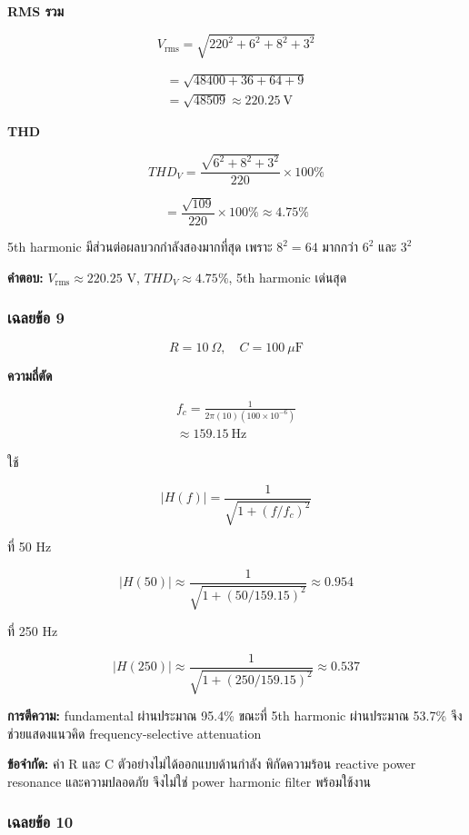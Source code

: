 \textbf{RMS รวม}

\[
V_{\mathrm{rms}}=\sqrt{220^2+6^2+8^2+3^2}
\]

\[
\begin{aligned}
    =\sqrt{48400+36+64+9} \\
    =\sqrt{48509}\approx220.25\ \text{V}
\end{aligned}
\]

\textbf{THD}

\[
THD_V=\frac{\sqrt{6^2+8^2+3^2}}{220}\times100\%
\]

\[
=\frac{\sqrt{109}}{220}\times100\%\approx4.75\%
\]

5th harmonic มีส่วนต่อผลบวกกำลังสองมากที่สุด เพราะ $8^2=64$ มากกว่า $6^2$ และ $3^2$

\textbf{คำตอบ:} $V_{\mathrm{rms}}\approx220.25$ V, $THD_V\approx4.75\%$, 5th harmonic เด่นสุด

\subsubsection{เฉลยข้อ 9}

\[
R=10\ \Omega,\quad C=100\ \mu\text{F}
\]

\textbf{ความถี่ตัด}

\[
\begin{aligned}
    f_c=\frac{1}{2\pi(10)(100\times10^{-6})} \\
    \approx159.15\ \text{Hz}
\end{aligned}
\]

ใช้

\[
|H(f)|=\frac{1}{\sqrt{1+(f/f_c)^2}}
\]

ที่ 50 Hz

\[
|H(50)|\approx\frac{1}{\sqrt{1+(50/159.15)^2}}\approx0.954
\]

ที่ 250 Hz

\[
|H(250)|\approx\frac{1}{\sqrt{1+(250/159.15)^2}}\approx0.537
\]

\textbf{การตีความ:} fundamental ผ่านประมาณ 95.4\% ขณะที่ 5th harmonic ผ่านประมาณ 53.7\% จึงช่วยแสดงแนวคิด frequency-selective attenuation

\textbf{ข้อจำกัด:} ค่า R และ C ตัวอย่างไม่ได้ออกแบบด้านกำลัง พิกัดความร้อน reactive power resonance และความปลอดภัย จึงไม่ใช่ power harmonic filter พร้อมใช้งาน

\subsubsection{เฉลยข้อ 10}

